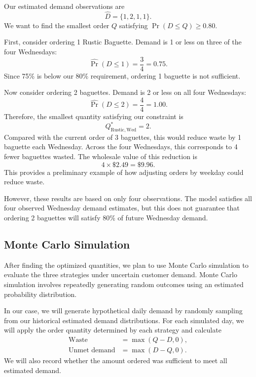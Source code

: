 \documentclass[11pt]{article}
\begin{document}
Our estimated demand observations are
\begin{equation}
\widehat D=\{1,2,1,1\}.
\end{equation}
We want to find the smallest order $Q$ satisfying $\Pr(D\le Q)\ge 0.80$.

First, consider ordering 1 Rustic Baguette. Demand is 1 or less on three of the four Wednesdays:
\begin{equation}
\widehat{\Pr}(D\le 1)=\frac{3}{4}=0.75.
\end{equation}
Since 75\% is below our 80\% requirement, ordering 1 baguette is not sufficient.

Now consider ordering 2 baguettes. Demand is 2 or less on all four Wednesdays:
\begin{equation}
\widehat{\Pr}(D\le 2)=\frac{4}{4}=1.00.
\end{equation}
Therefore, the smallest quantity satisfying our constraint is
\begin{equation}
\boxed{Q^*_{\mathrm{Rustic,Wed}}=2.}
\end{equation}
Compared with the current order of 3 baguettes, this would reduce waste by 1 baguette each Wednesday. Across the four Wednesdays, this corresponds to 4 fewer baguettes wasted. The wholesale value of this reduction is
\begin{equation}
4\times\$2.49=\$9.96.
\end{equation}
This provides a preliminary example of how adjusting orders by weekday could reduce waste.

However, these results are based on only four observations. The model satisfies all four observed Wednesday demand estimates, but this does not guarantee that ordering 2 baguettes will satisfy 80\% of future Wednesday demand.

\subsection{Monte Carlo Simulation}

After finding the optimized quantities, we plan to use Monte Carlo simulation to evaluate the three strategies under uncertain customer demand. Monte Carlo simulation involves repeatedly generating random outcomes using an estimated probability distribution.

In our case, we will generate hypothetical daily demand by randomly sampling from our historical estimated demand distributions. For each simulated day, we will apply the order quantity determined by each strategy and calculate
\begin{align}
\text{Waste} &= \max(Q-D,0),\\
\text{Unmet demand} &= \max(D-Q,0).
\end{align}
We will also record whether the amount ordered was sufficient to meet all estimated demand.
\end{document}
